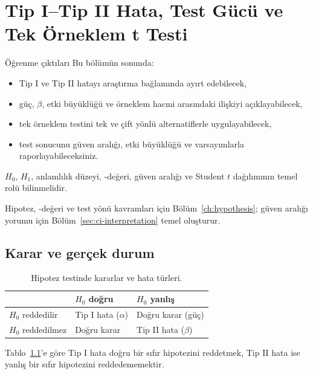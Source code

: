 \chapter{Tip I--Tip II Hata, Test Gücü ve Tek Örneklem t Testi}
\label{ch:power-one-sample}

\begin{prismbox}[PrismLight]{Öğrenme çıktıları}
Bu bölümün sonunda:
\begin{itemize}
  \item Tip I ve Tip II hatayı araştırma bağlamında ayırt edebilecek,
  \item güç, $\beta$, etki büyüklüğü ve örneklem hacmi arasındaki ilişkiyi açıklayabilecek,
  \item tek örneklem \tstat testini tek ve çift yönlü alternatiflerle uygulayabilecek,
  \item test sonucunu güven aralığı, etki büyüklüğü ve varsayımlarla raporlayabileceksiniz.
\end{itemize}
\end{prismbox}

\begin{prerequisitebox}
$H_0$, $H_1$, anlamlılık düzeyi, \pval-değeri, güven aralığı ve Student $t$
dağılımının temel rolü bilinmelidir.
\end{prerequisitebox}

Hipotez, \pval-değeri ve test yönü kavramları için Bölüm~\ref{ch:hypothesis};
güven aralığı yorumu için Bölüm~\ref{sec:ci-interpretation} temel oluşturur.

\section{Karar ve gerçek durum}
\label{sec:error-types}

\begin{table}[H]
\centering
\caption{Hipotez testinde kararlar ve hata türleri.}
\label{tab:error-decisions}
\begin{tabular}{p{}p{}p{}}
\toprule
 & $H_0$ doğru & $H_0$ yanlış \\
\midrule
$H_0$ reddedilir & Tip I hata ($\alpha$) & Doğru karar (güç) \\
$H_0$ reddedilmez & Doğru karar & Tip II hata ($\beta$) \\
\bottomrule
\end{tabular}
\end{table}

Tablo~\ref{tab:error-decisions}'e göre Tip I hata doğru bir sıfır hipotezini
reddetmek, Tip II hata ise yanlış bir
sıfır hipotezini reddedememektir.

